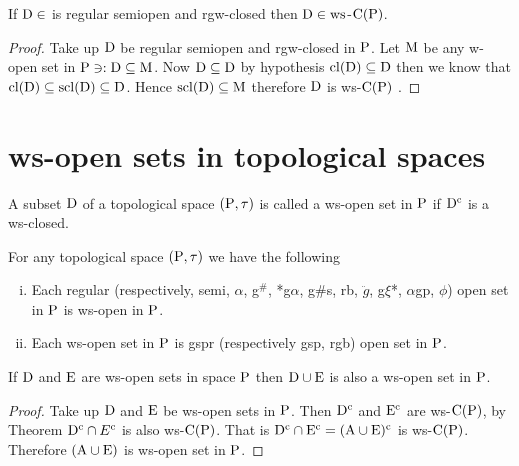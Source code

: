 \begin{thm}\label{thm2.2.47}
If $\mathrm{D}\in$ is regular semiopen and rgw-closed then $\mathrm{D}\in\mathrm{ws}$-$\mathrm{C}(\mathrm{P})$.
\end{thm}

\begin{proof}
Take up $\mathrm{D}$ be regular semiopen and rgw-closed in $\mathrm{P}$. Let $\mathrm{M}$ be any w-open set in $\mathrm{P} \ni: \mathrm{D}\subseteq \mathrm{M}$. Now $\mathrm{D}\subseteq \mathrm{D}$ by hypothesis $\mathrm{cl}(\mathrm{D})\subseteq \mathrm{D}$ then we know that $\mathrm{cl}(\mathrm{D}) \subseteq \mathrm{scl}(\mathrm{D})\subseteq \mathrm{D}$. Hence $\mathrm{scl}(\mathrm{D})\subseteq \mathrm{M}$ therefore $\mathrm{D}$ is ws-$\mathrm{C}(\mathrm{P})$ .
\end{proof}

\section{ws-open sets in topological spaces}

\begin{dfn}\label{defi2.3.1}
A subset $\mathrm{D}$ of a topological space $(\mathrm{P},\tau)$ is called a ws-open set in $\mathrm{P}$ if $\mathrm{D}^{\text{c}}$ is a ws-closed.
\end{dfn}

\begin{thm}\label{thm2.3.2}
For any topological space $(\mathrm{P},\tau)$ we have the following
\begin{enumerate}[(i)]
\item Each regular (respectively, semi, $\alpha$, g$^{\#}$, *g$\alpha$, g\#s, rb, $\ddot{g}$, g$\xi$*, $\alpha$gp, $\phi$) open set in $\mathrm{P}$ is ws-open in $\mathrm{P}$.
\item Each ws-open set in $\mathrm{P}$ is gspr (respectively gsp, rgb) open set in $\mathrm{P}$.
\end{enumerate}
\end{thm}

\begin{thm}\label{thm2.3.3}
If $\mathrm{D}$ and $\mathrm{E}$  are ws-open sets in space $\mathrm{P}$ then $\mathrm{D}\cup \mathrm{E}$  is also a ws-open set in $\mathrm{P}$.
\end{thm}

\begin{proof}
Take up $\mathrm{D}$ and $\mathrm{E}$ be ws-open sets in $\mathrm{P}$. Then $\mathrm{D}^{\text{c}}$ and $\mathrm{E}^{\text{c}}$ are ws-$\mathrm{C}(\mathrm{P})$, by Theorem  $\mathrm{D}^{\text{c}} \cap E^{\text{c}}$ is also ws-$\mathrm{C}(\mathrm{P})$. That is $\mathrm{D}^{\text{c}} \cap \mathrm{E}^{\text{c}} = (\mathrm{A}\cup \mathrm{E})^{\text{c}}$ is ws-$\mathrm{C}(\mathrm{P})$. Therefore $(\mathrm{A}\cup \mathrm{E})$ is ws-open set in $\mathrm{P}$.
\end{proof}


